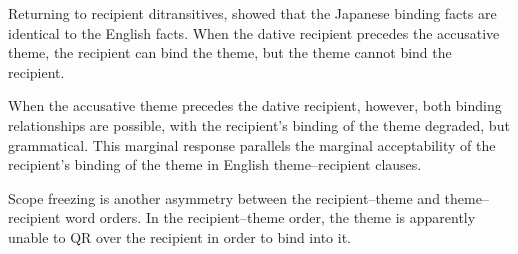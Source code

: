 Returning to recipient ditransitives, \cite{Takano.1998} showed that the Japanese binding facts are identical to the English facts. When the dative recipient precedes the accusative theme, the recipient can bind the theme, but the theme cannot bind the recipient.
\begin{exe}\ex \cite[ex 7]{Takano.1998}
\begin{xlist}
\end{xlist}
\end{exe}%
When the accusative theme precedes the dative recipient, however, both binding relationships are possible, with the recipient's binding of the theme degraded, but grammatical. This marginal response parallels the marginal acceptability of the recipient's binding of the theme in English theme--recipient clauses.
\begin{exe}\ex \cite[ex 7]{Takano.1998}
\begin{xlist}
\end{xlist}
\end{exe}

Scope freezing \citep{Aoun.1989,Bruening.2001,Bresnan.2007} is another asymmetry between the recipient--theme and theme--recipient word orders. In the recipient--theme order, the theme is apparently unable to QR over the recipient in order to bind into it. 


